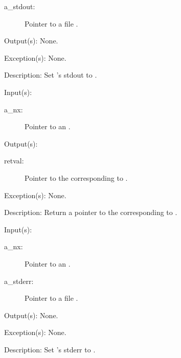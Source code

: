 \begin{capi}
\begin{capilist}
\begin{description}
		\item[a\_stdout: ]
			Pointer to a file .
		\end{description}
	\item[Output(s): ] None.
	\item[Exception(s): ] None.
	\item[Description: ]
		Set 's stdout to .
	\end{capilist}
\label{nx_stderr_get}
	\begin{capilist}
	\item[Input(s): ]
		\begin{description}\item[]
		\item[a\_nx: ]
			Pointer to an .
		\end{description}
	\item[Output(s): ]
		\begin{description}\item[]
		\item[retval: ]
			Pointer to the  corresponding to
			.
		\end{description}
	\item[Exception(s): ] None.
	\item[Description: ]
		Return a pointer to the  corresponding to
		.
	\end{capilist}
\label{nx_stderr_set}
	\begin{capilist}
	\item[Input(s): ]
		\begin{description}\item[]
		\item[a\_nx: ]
			Pointer to an \classname{nx}.
		\item[a\_stderr: ]
			Pointer to a file \classname{nxo}.
		\end{description}
	\item[Output(s): ] None.
	\item[Exception(s): ] None.
	\item[Description: ]
		Set 's stderr to \cvar{a\_stderr}.
	\end{capilist}
\end{capi}
